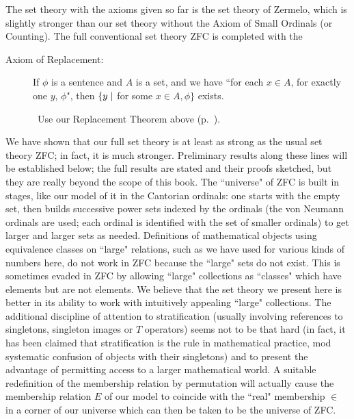 The set theory with the axioms given so far is the set theory
of Zermelo, which is slightly
stronger than our set theory without the Axiom of Small Ordinals (or Counting).  The full conventional
set theory ZFC is completed with the

\begin{description}
 \item[\fdescr Axiom of Replacement:]  If
   $\phi$ is a sentence and $A$ is a set, and we have ``for each $x \in A$, for
   exactly one $y$, $\phi$", then $\{y \mid$ for some $x \in A, \phi\}$ 
   exists.

   \preuve\ Use our Replacement Theorem above (p.~\pageref{repl-thm}).
   \finpreuve
\end{description}

We have shown that our full set theory is at least as strong as the
usual set theory ZFC; in fact, it is much
stronger.
Preliminary results along these lines will be established below; the
full results are stated and their proofs sketched, but they are really
beyond the scope of this book.  The ``universe"
of ZFC is 
built in stages, like our model of it in the Cantorian
ordinals: one starts with the empty set, then builds successive power sets indexed 
by the ordinals (the von Neumann ordinals are used;
each ordinal is identified with the set of smaller ordinals) to get larger and
larger sets as needed.  Definitions of mathematical objects using equivalence
classes on ``large"
relations, such as we have used for various kinds 
of numbers here, do not work in ZFC because
the ``large" sets do not exist.  This is sometimes evaded in ZFC by
allowing ``large" collections as ``classes" which have elements but are not
elements.  We believe that the set theory we present here is better in
its ability to work with intuitively appealing ``large" collections.
The additional discipline of attention to stratification
(usually involving references to singletons, singleton
images or $T$ operators)
seems not to be that hard (in fact, it has been claimed that
stratification is the rule in mathematical practice, mod systematic
confusion of objects with their singletons) and to present the
advantage of permitting access to a larger mathematical world.  A
suitable redefinition of the membership relation by
permutation will actually cause the membership relation $E$ of our model to
coincide with the ``real" membership $\in$ in a corner of our
universe which can then be taken to be the
universe of ZFC.

